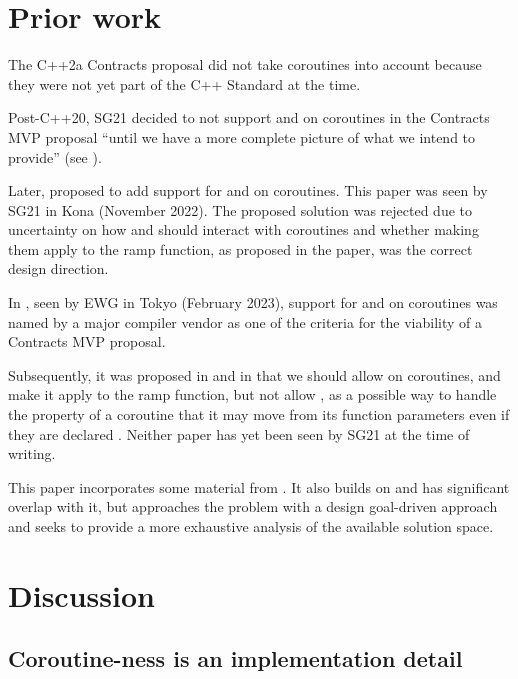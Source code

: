 \section{Prior work}

The C++2a Contracts proposal \cite{P0542R5} did not take coroutines into account because they were not yet part of the C++ Standard at the time.

Post-C++20, SG21 decided to not support  and  on coroutines in the Contracts MVP proposal ``until we have a more complete picture of what we intend to provide'' (see \cite{P2932R3}).

Later, \cite{P2957R0} proposed to add support for  and  on coroutines. This paper was seen by SG21 in Kona (November 2022). The proposed solution was rejected due to uncertainty on how  and  should interact with coroutines and whether making them apply to the ramp function, as proposed in the paper, was the correct design direction.

In \cite{P3173R0}, seen by EWG in Tokyo (February 2023), support for  and  on coroutines was named by a major compiler vendor as one of the criteria for the viability of a Contracts MVP proposal.

Subsequently, it was proposed in \cite{P2957R1} and in \cite{P3251R0} that we should allow  on coroutines, and make it apply to the ramp function, but not allow , as a possible way to handle the property of a coroutine that it may move from its function parameters even if they are declared . Neither paper has yet been seen by SG21 at the time of writing.

This paper incorporates some material from \cite{P3251R0}. It also builds on \cite{P2957R1} and has significant overlap with it, but approaches the problem with a design goal-driven approach and seeks to provide a more exhaustive analysis of the available solution space. 

\section{Discussion}

\subsection{Coroutine-ness is an implementation detail}
\label{impldetail}

